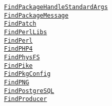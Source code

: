 \documentclass{article}
\newcommand{\cmakemodule}[1]{{\href{https://cmake.org/cmake/help/v3.13/module/#1.html}{{\lstinline{#1}}}}}
\begin{document}
\begin{minipage}[t]{0.18\linewidth}
\cmakemodule{FindPackageHandleStandardArgs}\\
\cmakemodule{FindPackageMessage}\\
\cmakemodule{FindPatch}\\
\cmakemodule{FindPerlLibs}\\
\cmakemodule{FindPerl}\\
\cmakemodule{FindPHP4}\\
\cmakemodule{FindPhysFS}\\
\cmakemodule{FindPike}\\
\cmakemodule{FindPkgConfig}\\
\cmakemodule{FindPNG}\\
\cmakemodule{FindPostgreSQL}\\
\cmakemodule{FindProducer}\\
\end{minipage}
\hfill\vline\hfill
\end{document}
